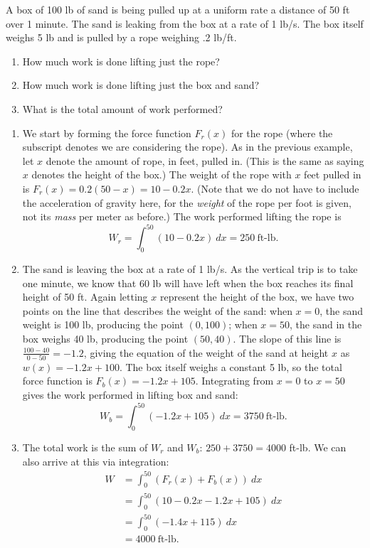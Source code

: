 \begin{example}\label{ex_work2}
A box of 100 lb of sand is being pulled up at a uniform rate a distance of 50 ft over 1 minute. The sand is leaking from the box at a rate of 1 lb/s. The box itself weighs 5 lb and is pulled by a rope weighing .2 lb/ft. 
\begin{enumerate}
	\item	How much work is done lifting just the rope?
	\item	How much work is done lifting just the box and sand?
	\item	What is the total amount of work performed?
\end{enumerate}
\solution
\begin{enumerate}
	\item	We start by forming the force function $F_r(x)$ for the rope (where the subscript denotes we are considering the rope). As in the previous example, let $x$ denote the amount of rope, in feet, pulled in. (This is the same as saying $x$ denotes the height of the box.) The weight of the rope with $x$ feet pulled in is $F_r(x) = 0.2(50-x) = 10-0.2x$. (Note that we do not have to include the acceleration of gravity here, for the \textit{weight} of the rope per foot is given, not its \textit{mass} per meter as before.) The work performed lifting the rope is 
	\[W_r = \int_0^{50} (10-0.2x)\ dx = 250\ \text{ft-lb}.\]
	
	\item	The sand is leaving the box at a rate of 1 lb/s. As the vertical trip is to take one minute, we know that 60 lb will have left when the box reaches its final height of 50 ft. Again letting $x$ represent the height of the box, we have two points on the line that describes the weight of the sand: when $x=0$, the sand weight is 100 lb, producing the point $(0,100)$; when $x=50$, the sand in the box weighs 40 lb, producing the point $(50,40)$. The slope of this line is $\frac{100-40}{0-50} = -1.2$, giving the equation of the weight of the sand at height $x$ as $w(x) = -1.2x+100$. The box itself weighs a constant 5 lb, so the total force function is $F_b(x) = -1.2x+105$. Integrating from $x=0$ to $x=50$ gives the work performed in lifting box and sand:
	\[W_b = \int_0^{50} (-1.2x+105)\ dx = 3750\ \text{ft-lb.}\]
	
	\item	The total work is the sum of $W_r$ and $W_b$: $250+3750=4000$ ft-lb. We can also arrive at this via integration:
	\begin{align*}
	W
	&= \int_0^{50} (F_r(x)+F_b(x))\ dx \\
	&= \int_0^{50} (10-0.2x-1.2x+105)\ dx \\
	&= \int_0^{50} (-1.4x+115) \ dx \\
	&= 4000 \ \text{ft-lb.}
	\end{align*}	
\end{enumerate}
\end{example}


